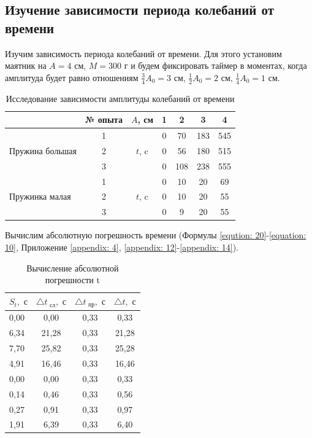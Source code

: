 \subsection{Изучение зависимости периода колебаний от времени}
Изучим зависимость периода колебаний от времени. Для этого установим маятник на $A = 4 \text{ см}$, $M = 300 \text{ г}$ и будем фиксировать таймер в моментах, когда амплитуда будет равно отношениям $\frac{3}{4} A_0 = 3 \text{ см}$, $\frac{1}{2} A_0 = 2 \text{ см}$, $\frac{1}{4} A_0 = 1 \text{ см}$. 

\begin{table}[htbp]
	\label{tabular:measuring_4}
	\caption{Исследование зависимости амплитуды колебаний от времени}
	\centering
	\begin{tabular}{|l|c|c|c|c|c|c|}
		\hline
		                                 & № опыта &         $A$, см         &   1   &   2   &   3   &   4   \\ \hline
		\multirow{3}{*}{Пружина большая} &    1    & \multirow{3}{*}{$t$, c} & 0 & 70 & 183 & 545 \\
		                                 &    2    &                         & 0 & 56 & 180 & 515 \\
		                                 &    3    &                         & 0 & 108 & 238 & 555 \\ \hline
		\multirow{3}{*}{Пружинка малая}  &    1    & \multirow{3}{*}{$t$, c} & 0 & 10 & 20 & 69 \\
		                                 &    2    &                         & 0 & 10 & 20 & 55 \\
		                                 &    3    &                         & 0 & 9 & 20 & 55 \\ \hline
	\end{tabular}
\end{table}

Вычислим абсолютную погрешность времени (Формулы \ref{eqution: 20}-\ref{equation: 10}, Приложение \ref{appendix: 4}, \ref{appendix: 12}-\ref{appendix: 14}).

\begin{table}[H]
	\label{tabular:measuring_5}
	\caption{Вычисление абсолютной погрешности t}
	\centering
	\begin{tabular}{|l|c|c|c|}
		\hline
		$S_t,\text{ с}$ & $\triangle t_{\text{ сл}},\text{ с}$ & $\triangle t_{\text{ пр}},\text{ с}$ & $\triangle t, \text{ с}$ \\
		\hline
		0,00 & 0,00 & 0,33 & 0,33 \\
		\hline
		6,34 & 21,28 & 0,33 & 21,28 \\
		\hline
		7,70 & 25,82 & 0,33 & 25,28 \\
		\hline
		4,91 & 16,46 & 0,33 & 16,46 \\
		\hline
		0,00 & 0,00 & 0,33 & 0,33 \\
		\hline
		0,14 & 0,46 & 0,33 & 0,56 \\
		\hline
		0,27 & 0,91 & 0,33 & 0,97 \\
		\hline
		1,91 & 6,39 & 0,33 & 6,40 \\
		\hline
	\end{tabular}
\end{table}
 
